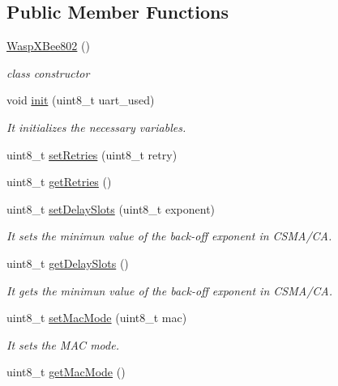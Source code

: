 \subsection*{Public Member Functions}
\begin{DoxyCompactItemize}
\item 
\hyperlink{class_wasp_x_bee802_ada15251381d333b599ea771846a0f66a}{Wasp\+X\+Bee802} ()
\begin{DoxyCompactList}\small\item\em class constructor \end{DoxyCompactList}\item 
void \hyperlink{class_wasp_x_bee802_a56812ba1a268a0a7e2ff0415775cb564}{init} (uint8\+\_\+t uart\+\_\+used)
\begin{DoxyCompactList}\small\item\em It initializes the necessary variables. \end{DoxyCompactList}\item 
uint8\+\_\+t \hyperlink{class_wasp_x_bee802_a21644a1e20fdf83fdaa4d15d514f85f5}{set\+Retries} (uint8\+\_\+t retry)
\item 
uint8\+\_\+t \hyperlink{class_wasp_x_bee802_a37db265da4aaf51ac40c950c94e31fbd}{get\+Retries} ()
\item 
uint8\+\_\+t \hyperlink{class_wasp_x_bee802_ac9c3c856ed7608d4684792d6c8a247fb}{set\+Delay\+Slots} (uint8\+\_\+t exponent)
\begin{DoxyCompactList}\small\item\em It sets the minimun value of the back-\/off exponent in C\+S\+M\+A/\+CA. \end{DoxyCompactList}\item 
uint8\+\_\+t \hyperlink{class_wasp_x_bee802_a8325d3cb7ce5b16ff1ddfe9c17bdd65e}{get\+Delay\+Slots} ()
\begin{DoxyCompactList}\small\item\em It gets the minimun value of the back-\/off exponent in C\+S\+M\+A/\+CA. \end{DoxyCompactList}\item 
uint8\+\_\+t \hyperlink{class_wasp_x_bee802_a4aa47519ff335b0fcbf4afb3133af11c}{set\+Mac\+Mode} (uint8\+\_\+t mac)
\begin{DoxyCompactList}\small\item\em It sets the M\+AC mode. \end{DoxyCompactList}\item 
uint8\+\_\+t \hyperlink{class_wasp_x_bee802_a6b63e24d4379abd85bbb659ebd03383d}{get\+Mac\+Mode} ()

\end{DoxyCompactItemize}

